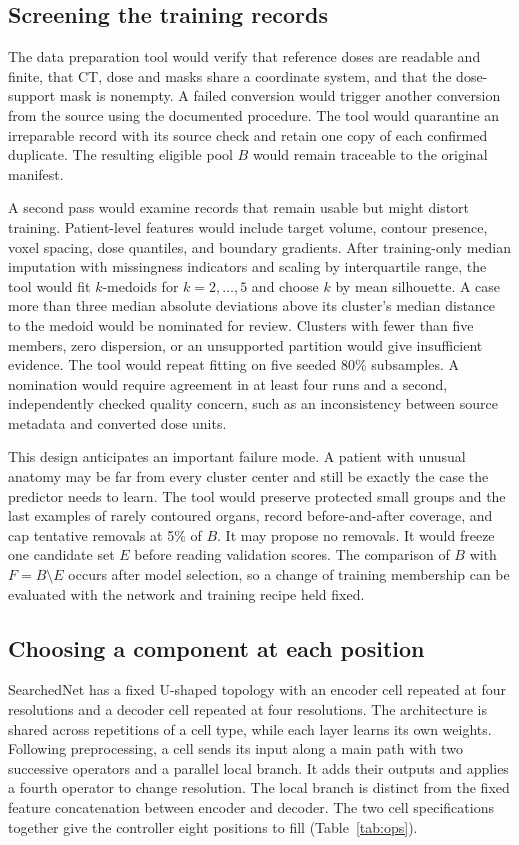 \documentclass[letterpaper]{article}
\begin{document}
\subsection{Screening the training records}
The data preparation tool would verify that reference doses are readable and finite, that CT, dose and masks share a coordinate system, and that the dose-support mask is nonempty. A failed conversion would trigger another conversion from the source using the documented procedure. The tool would quarantine an irreparable record with its source check and retain one copy of each confirmed duplicate. The resulting eligible pool $B$ would remain traceable to the original manifest.

A second pass would examine records that remain usable but might distort training. Patient-level features would include target volume, contour presence, voxel spacing, dose quantiles, and boundary gradients. After training-only median imputation with missingness indicators and scaling by interquartile range, the tool would fit $k$-medoids for $k=2,\ldots,5$ and choose $k$ by mean silhouette. A case more than three median absolute deviations above its cluster's median distance to the medoid would be nominated for review. Clusters with fewer than five members, zero dispersion, or an unsupported partition would give insufficient evidence. The tool would repeat fitting on five seeded 80\% subsamples. A nomination would require agreement in at least four runs and a second, independently checked quality concern, such as an inconsistency between source metadata and converted dose units.

This design anticipates an important failure mode. A patient with unusual anatomy may be far from every cluster center and still be exactly the case the predictor needs to learn. The tool would preserve protected small groups and the last examples of rarely contoured organs, record before-and-after coverage, and cap tentative removals at 5\% of $B$. It may propose no removals. It would freeze one candidate set $E$ before reading validation scores. The comparison of $B$ with $F=B\setminus E$ occurs after model selection, so a change of training membership can be evaluated with the network and training recipe held fixed.

\subsection{Choosing a component at each position}
SearchedNet has a fixed U-shaped topology with an encoder cell repeated at four resolutions and a decoder cell repeated at four resolutions. The architecture is shared across repetitions of a cell type, while each layer learns its own weights. Following preprocessing, a cell sends its input along a main path with two successive operators and a parallel local branch. It adds their outputs and applies a fourth operator to change resolution. The local branch is distinct from the fixed feature concatenation between encoder and decoder. The two cell specifications together give the controller eight positions to fill (Table~\ref{tab:ops}).
\end{document}
